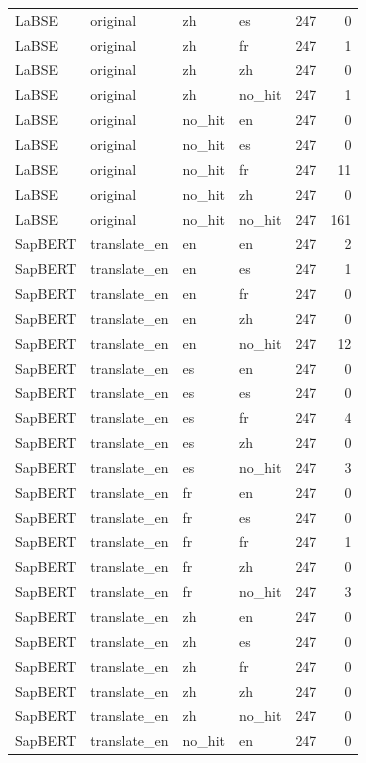\begin{tabular}{llllrr}
LaBSE & original & zh & es & 247 & 0 \\
LaBSE & original & zh & fr & 247 & 1 \\
LaBSE & original & zh & zh & 247 & 0 \\
LaBSE & original & zh & no\_hit & 247 & 1 \\
LaBSE & original & no\_hit & en & 247 & 0 \\
LaBSE & original & no\_hit & es & 247 & 0 \\
LaBSE & original & no\_hit & fr & 247 & 11 \\
LaBSE & original & no\_hit & zh & 247 & 0 \\
LaBSE & original & no\_hit & no\_hit & 247 & 161 \\
SapBERT & translate\_en & en & en & 247 & 2 \\
SapBERT & translate\_en & en & es & 247 & 1 \\
SapBERT & translate\_en & en & fr & 247 & 0 \\
SapBERT & translate\_en & en & zh & 247 & 0 \\
SapBERT & translate\_en & en & no\_hit & 247 & 12 \\
SapBERT & translate\_en & es & en & 247 & 0 \\
SapBERT & translate\_en & es & es & 247 & 0 \\
SapBERT & translate\_en & es & fr & 247 & 4 \\
SapBERT & translate\_en & es & zh & 247 & 0 \\
SapBERT & translate\_en & es & no\_hit & 247 & 3 \\
SapBERT & translate\_en & fr & en & 247 & 0 \\
SapBERT & translate\_en & fr & es & 247 & 0 \\
SapBERT & translate\_en & fr & fr & 247 & 1 \\
SapBERT & translate\_en & fr & zh & 247 & 0 \\
SapBERT & translate\_en & fr & no\_hit & 247 & 3 \\
SapBERT & translate\_en & zh & en & 247 & 0 \\
SapBERT & translate\_en & zh & es & 247 & 0 \\
SapBERT & translate\_en & zh & fr & 247 & 0 \\
SapBERT & translate\_en & zh & zh & 247 & 0 \\
SapBERT & translate\_en & zh & no\_hit & 247 & 0 \\
SapBERT & translate\_en & no\_hit & en & 247 & 0 \\

\end{tabular}
